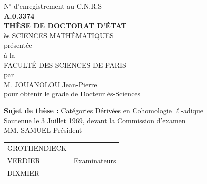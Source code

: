 \documentclass[12pt,twoside]{report} %
\begin{document}
\thispagestyle{empty}
\vspace*{\fill}
\begin{center}
    {\large N$^\circ$ d'enregistrement au C.N.R.S} \\
    \vspace{0.5em}
    {\bf A.0.3374} \\
    \vspace{4em}
    {\LARGE\bf THÈSE DE DOCTORAT D'ÉTAT} \\
    \vspace{0.5em}
    {\large ès SCIENCES MATHÉMATIQUES} \\
    \vspace{1em}
    présentée \\
    à la \\
    FACULTÉ DES SCIENCES DE PARIS \\
    \vspace{2em}
    par \\
    \vspace{2em}
    {\Large M. JOUANOLOU Jean-Pierre} \\
    \vspace{1em}
    pour obtenir le grade de Docteur ès-Sciences \\
\end{center}
\vspace*{\fill}
\begin{center}
    {\bf Sujet de thèse :} {\Large Catégories Dérivées en Cohomologie $\ell$-adique} \\
    \vspace{1em}
    Soutenue le 3 Juillet 1969, devant la Commission d'examen \\
    \vspace{1em}
    MM. SAMUEL \quad\quad Président \\
    \vspace{0.5em}
\begin{tabular}{@{}l@{\hspace{3cm}}r@{}}
GROTHENDIECK & \\
VERDIER & Examinateurs \\
DIXMIER & \\
\end{tabular}
\end{center}
\vspace*{\fill}

\newpage
\thispagestyle{empty}
\mbox{}


\renewcommand{\contentsname}{TABLE DES MATIÈRES}
\tableofcontents\thispagestyle{empty}
\end{document}
